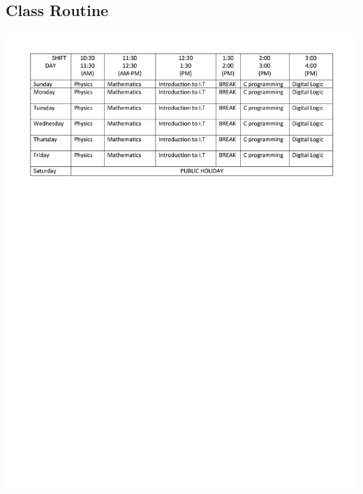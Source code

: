 \documentclass[17pt,a4paper,oneside,margin=1in]{article}
\begin{document}
\subsection{Class Routine}
\includegraphics[width=1.2\textwidth]{./scrot/routine.png}
\pagebreak
\end{document}
